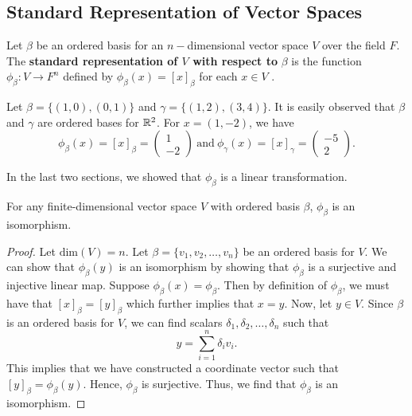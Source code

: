 \subsection{Standard Representation of Vector Spaces}

\begin{definition}
    Let \( \beta \) be an ordered basis for an \( n- \)dimensional vector space \( V  \) over the field \( F \). The \textbf{standard representation of \( V \) with respect to} \( \beta  \) is the function \( {\phi}_{\beta}: V \to F^{n} \) defined by \( {\phi}_{\beta}(x) = [x]_{\beta} \) for each \( x \in V  \) .    
\end{definition}

\begin{eg}
    Let \( \beta = \{ (1,0), (0,1) \}  \) and \( \gamma = \{ (1,2), (3,4) \}  \). It is easily observed that \( \beta  \) and \( \gamma  \) are ordered bases for \( \mathbb{R}^{2} \). For \( x = (1,-2) \), we have
    \[  {\phi}_{\beta}(x) = [x]_{\beta} = \begin{pmatrix}
        1 \\
        -2
        \end{pmatrix} \ \text{and} \ {\phi}_{\gamma}(x) = [x]_{\gamma} = \begin{pmatrix}
        -5 \\
        2 
    \end{pmatrix}.  \]
\end{eg}

In the last two sections, we showed that \( {\phi}_{\beta} \) is a linear transformation. 

\begin{theorem}
    For any finite-dimensional vector space \( V  \) with ordered basis \( \beta  \), \( {\phi}_{\beta}  \) is an isomorphism.
\end{theorem}
\begin{proof}
    Let \( \text{dim}(V) = n  \). Let \( \beta = \{ {v}_{1}, { v }_{2}, \dots, {v}_{n} \}   \) be an ordered basis for \( V  \). We can show that \( {\phi}_{\beta}(y)  \) is an isomorphism by showing that \( {\phi}_{\beta} \) is a surjective and injective linear map. Suppose \( {\phi}_{\beta}(x) = {\phi}_{\beta} \). Then by definition of \( {\phi}_{\beta} \), we must have that \( [x]_{\beta} = [y]_{\beta} \) which further implies that \( x = y  \). Now, let \( y \in V  \). Since \( \beta \) is an ordered basis for \( V  \), we can find scalars \( {\delta}_{1}, {\delta}_{2}, \dots, {\delta}_{n} \) such that 
    \[  y = \sum_{ i=1  }^{ n } {\delta}_{i} {v}_{i}. \]
    This implies that we have constructed a coordinate vector such that \( [y]_{\beta} = {\phi}_{\beta}(y)\). Hence, \( {\phi}_{\beta} \) is surjective. Thus, we find that \( {\phi}_{\beta} \) is an isomorphism.
\end{proof}


